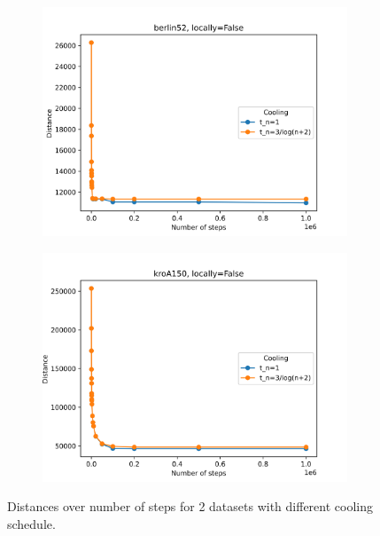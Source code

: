 \begin{figure}[!htb]
	\centering
	\begin{subfigure}{0.45\textwidth}
		\includegraphics[width=\textwidth]{img/berlin52_annealing_locally=False}
	\end{subfigure}
	\begin{subfigure}{0.45\textwidth}
		\includegraphics[width=\textwidth]{img/kroA150_annealing_locally=False}
	\end{subfigure}
	\caption{Distances over number of steps for 2 datasets with different cooling schedule.}
	\label{fig:annealing}
\end{figure}
